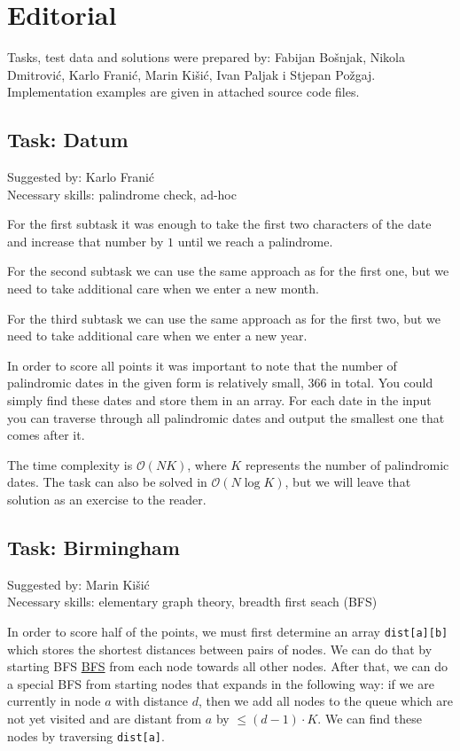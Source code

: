 \documentclass[a4paper]{article}
\begin{document}
\section*{Editorial}
Tasks, test data and solutions were prepared by: Fabijan Bošnjak,
Nikola Dmitrović, Karlo Franić, Marin Kišić, Ivan Paljak i Stjepan
Požgaj.  Implementation examples are given in attached source code
files.

\subsection*{Task: Datum}
\textsf{Suggested by: Karlo Franić}\\
\textsf{Necessary skills: palindrome check, ad-hoc}

For the first subtask it was enough to take the first two characters
of the date and increase that number by $1$ until we reach a palindrome.

For the second subtask we can use the same approach as for the first one, but we
need to take additional care when we enter a new month.

For the third subtask we can use the same approach as for the first two, but
we need to take additional care when we enter a new year.

In order to score all points it was important to note that the number of
palindromic dates in the given form is relatively small, $366$ in total.
You could simply find these dates and store them in an array. For each date
in the input you can traverse through all palindromic dates and output the
smallest one that comes after it.

The time complexity is $\mathcal{O}(NK)$, where $K$ represents the
number of palindromic dates. The task can also be solved in $\mathcal{O}(N
\log K)$, but we will leave that solution as an exercise to the reader.

\subsection*{Task: Birmingham}
\textsf{Suggested by: Marin Kišić}\\
\textsf{Necessary skills: elementary graph theory, breadth first seach (BFS)}

In order to score half of the points, we must first determine an array
\texttt{dist[a][b]} which stores the shortest distances between pairs of nodes.
We can do that by starting BFS
\href{https://en.wikipedia.org/wiki/Breadth-first\_search}{BFS} from each node
towards all other nodes. After that, we can do a special BFS from starting nodes
that expands in the following way: if we are currently in node $a$ with distance
$d$, then we add all nodes to the queue which are not yet visited and are
distant from $a$ by $\le (d-1) \cdot K$. We can find these nodes by traversing
\texttt{dist[a]}.
\end{document}
